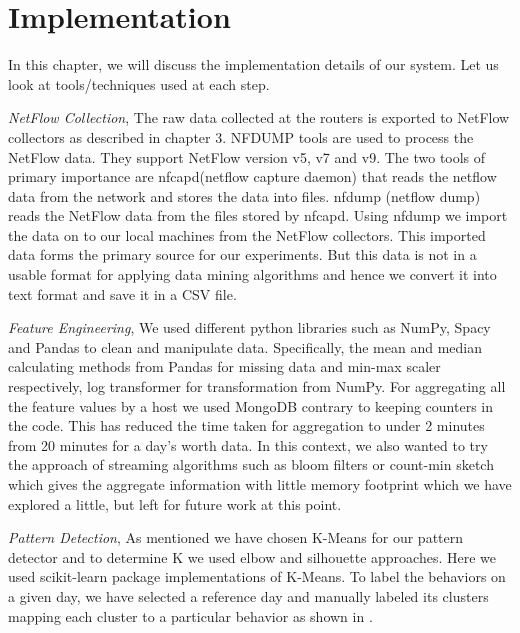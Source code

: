 \label{key}%

\chapter{Implementation}

In this chapter, we will discuss the implementation details of our system. Let us look at tools/techniques used at each step.  

\textit{NetFlow Collection},  The raw data collected at the routers is exported to NetFlow collectors as described in chapter 3. NFDUMP \cite{haag2005watch} tools are used to process the NetFlow data. They support NetFlow version v5, v7 and v9. The two tools of primary importance are nfcapd(netflow capture daemon) that reads the netflow data from the network and stores the data into files. nfdump (netflow dump) reads the NetFlow data from the files stored by nfcapd. Using nfdump we import the data on to our local machines
from the NetFlow collectors. This imported data forms the
primary source for our experiments. But this data is not in a usable format for applying data mining algorithms and hence we convert it into text format and save it in a CSV file.

\textit{Feature Engineering}, We used different python libraries such as NumPy, Spacy and Pandas to clean and manipulate data. Specifically, the mean and median calculating methods from Pandas for missing data and min-max scaler respectively, log transformer for transformation from NumPy. For aggregating all the feature values by a host we used MongoDB contrary to keeping counters in the code. This has reduced the time taken  for aggregation to under 2 minutes from 20 minutes for a day's worth data. In this context, we also wanted to try the approach of streaming algorithms such as bloom filters or count-min sketch which gives the aggregate information with little memory footprint which we have explored a little, but left for future work at this point.

\textit{Pattern Detection}, As mentioned we have chosen K-Means for our pattern detector and to determine K we used elbow and silhouette approaches. Here we used scikit-learn package implementations of K-Means. To label the behaviors on a given day, we have selected a reference day and manually labeled its clusters mapping each cluster to a particular behavior as shown in .

